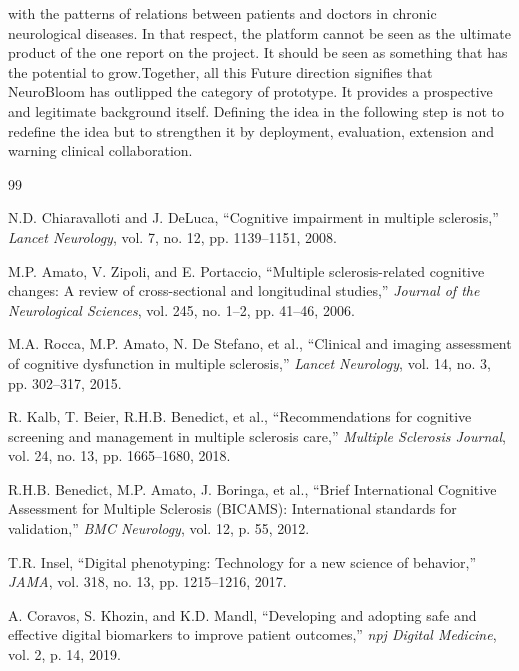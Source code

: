 \documentclass[12pt,a4paper]{report}
\begin{document}
with the patterns of relations between patients and doctors in chronic neurological diseases. In that respect, the platform cannot be seen as the ultimate product of the one report on the project. It should be seen as something that has the potential to grow.Together, all this Future direction signifies that NeuroBloom has outlipped the category of prototype. It provides a prospective and legitimate background itself. Defining the idea in the following step is not to redefine the idea but to strengthen it by deployment, evaluation, extension and warning clinical collaboration.

\clearpage
{}
\begingroup
\singlespacing
\small
\setlength{\itemsep}{0pt}
\setlength{\parsep}{0pt}
\begin{thebibliography}{99}

N.D. Chiaravalloti and J. DeLuca,
``Cognitive impairment in multiple sclerosis,''
\textit{Lancet Neurology}, vol. 7, no. 12, pp. 1139--1151, 2008.

M.P. Amato, V. Zipoli, and E. Portaccio,
``Multiple sclerosis-related cognitive changes: A review of cross-sectional and longitudinal studies,''
\textit{Journal of the Neurological Sciences}, vol. 245, no. 1--2, pp. 41--46, 2006.

M.A. Rocca, M.P. Amato, N. De Stefano, et al.,
``Clinical and imaging assessment of cognitive dysfunction in multiple sclerosis,''
\textit{Lancet Neurology}, vol. 14, no. 3, pp. 302--317, 2015.

R. Kalb, T. Beier, R.H.B. Benedict, et al.,
``Recommendations for cognitive screening and management in multiple sclerosis care,''
\textit{Multiple Sclerosis Journal}, vol. 24, no. 13, pp. 1665--1680, 2018.

R.H.B. Benedict, M.P. Amato, J. Boringa, et al.,
``Brief International Cognitive Assessment for Multiple Sclerosis (BICAMS): International standards for validation,''
\textit{BMC Neurology}, vol. 12, p. 55, 2012.

T.R. Insel,
``Digital phenotyping: Technology for a new science of behavior,''
\textit{JAMA}, vol. 318, no. 13, pp. 1215--1216, 2017.

A. Coravos, S. Khozin, and K.D. Mandl,
``Developing and adopting safe and effective digital biomarkers to improve patient outcomes,''
\textit{npj Digital Medicine}, vol. 2, p. 14, 2019.


\end{thebibliography}
\end{document}
